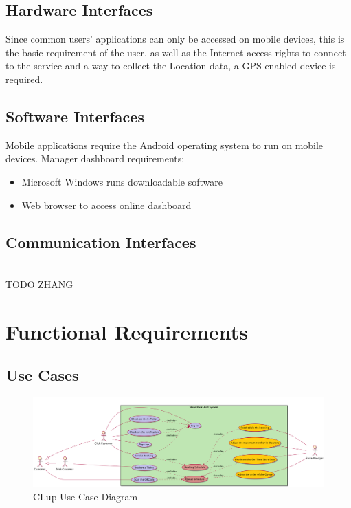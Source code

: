 \documentclass[a4paper,12pt]{report}
\begin{document}
\subsection{Hardware Interfaces}
Since common users’ applications can only be accessed on mobile devices, this is the basic requirement of the user, as well as the Internet access rights to connect to the service and
a way to collect the Location data, a GPS-enabled device is required.

\subsection{Software  Interfaces}
Mobile applications require the Android operating system to run on mobile devices.
Manager dashboard requirements:
\begin{itemize}
	\item Microsoft Windows runs downloadable software
	\item Web browser to access online dashboard
\end{itemize}

\subsection{Communication Interfaces}
\\TODO ZHANG


\section{Functional Requirements}
\subsection{Use Cases}

\begin{figure}
	\includegraphics[angle=90,scale=0.17]{usecase_diagram.png}
	\centering
	\caption{CLup Use Case Diagram}
	\label{Use Case}
\end{figure}
\end{document}
